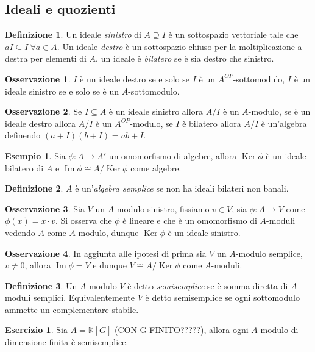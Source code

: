 \documentclass[11pt]{article}
\theoremstyle{plain}
\theoremstyle{definition}
\newtheorem{defn}{Definizione}[section]
\newtheorem{exmp}{Esempio}[section]
\newtheorem{exercise}{Esercizio}[section]
\newtheorem*{rem}{Osservazione}
\theoremstyle{remark}
\newcommand{\K}{\mathbb{K}}
\DeclareMathOperator{\Ker}{Ker}
\DeclareMathOperator{\Imm}{Im}
\begin{document}
\subsection{Ideali e quozienti}
	\begin{defn}
		Un ideale \textit{sinistro} di $A\supseteq I$ è un sottospazio vettoriale tale che $aI\subseteq I\ \forall a\in A$. Un ideale \textit{destro} è un sottospazio chiuso per la moltiplicazione a destra per elementi di $A$, un ideale è \textit{bilatero} se è sia destro che sinistro.
	\end{defn}
	\begin{rem}
		$I$ è un ideale destro se e solo se $I$ è un $A^{OP}$-sottomodulo, $I$ è un ideale sinistro se e solo se è un $A$-sottomodulo.
	\end{rem}
	\begin{rem}
		Se $I\subseteq A$ è un ideale sinistro allora $A/I$ è un $A$-modulo, se è un ideale destro allora $A/I$ è un $A^{OP}$-modulo, se $I$ è bilatero allora $A/I$ è un'algebra definendo $(a+I)(b+I)=ab+I$.
	\end{rem}
	\begin{exmp}
		Sia $\phi:A\to A'$ un omomorfismo di algebre, allora $\Ker \phi$ è un ideale bilatero di $A$ e $\Imm \phi \cong A/\Ker \phi$ come algebre.
	\end{exmp}
	\begin{defn}
		$A$ è un'\textit{algebra semplice} se non ha ideali bilateri non banali.
	\end{defn}
	\begin{rem}
		Sia $V$ un $A$-modulo sinistro, fissiamo $v\in V$, sia $\phi:A\to V$ come $\phi(x)=x\cdot v$. Si osserva che $\phi$ è lineare e che è un omomorfismo di $A$-moduli vedendo $A$ come $A$-modulo, dunque $\Ker \phi$ è un ideale sinistro.
	\end{rem}
	\begin{rem}
		In aggiunta alle ipotesi di prima sia $V$ un $A$-modulo semplice, $v\neq 0$, allora $\Imm \phi = V$ e dunque $V\cong A/\Ker \phi$ come $A$-moduli.
	\end{rem}
	\begin{defn}
		Un $A$-modulo $V$ è detto \textit{semisemplice} se è somma diretta di $A$-moduli semplici. Equivalentemente $V$ è detto semisemplice se ogni sottomodulo ammette un complementare stabile.
	\end{defn}
	\begin{exercise}
		Sia $A=\K[G]$ (CON G FINITO?????), allora ogni $A$-modulo di dimensione finita è semisemplice.
	\end{exercise}
\end{document}
